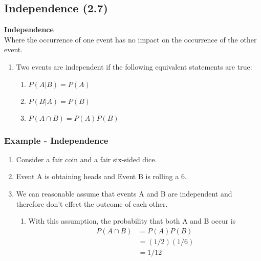 \documentclass[../INDE315.tex]{subfiles}
\begin{document}
\subsection*{Independence (2.7)}
\begin{defn}
    \textbf{Independence} \\
    Where the occurrence of one event has no impact on the occurrence of the other event.
    \begin{enumerate}
        \item Two events are independent if the following equivalent statements are true:
            \begin{enumerate}
                \item $P(A|B) = P(A)$
                \item $P(B|A) = P(B)$
                \item $P(A \cap B) = P(A)P(B)$
            \end{enumerate}
    \end{enumerate}
\end{defn}

\subsubsection*{Example - Independence}
\begin{enumerate}
    \item Consider a fair coin and a fair six-sided dice.
    \item Event A is obtaining heads and Event B is rolling a 6.
    \item We can reasonable assume that events A and B are independent and therefore don't effect the outcome of each other.
        \begin{enumerate}
            \item With this assumption, the probability that both A and B occur is
                \begin{equation*}
                    \begin{aligned}
                        P(A \cap B) &= P(A) P(B) \\
                                &= (1/2) (1/6) \\
                                &= 1/12
                    \end{aligned}
                \end{equation*} 
        \end{enumerate}
\end{enumerate}
\end{document}
